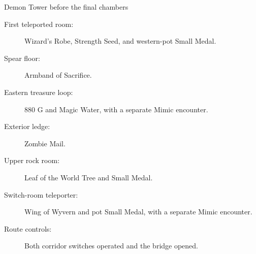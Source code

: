 \begin{routecheck}{Demon Tower before the final chambers}
\begin{description}
  \item[First teleported room:] Wizard's Robe, Strength Seed,
    and western-pot Small Medal.
  \item[Spear floor:] Armband of Sacrifice.
  \item[Eastern treasure loop:] 880 G and Magic Water, with a
    separate Mimic encounter.
  \item[Exterior ledge:] Zombie Mail.
  \item[Upper rock room:] Leaf of the World Tree and Small Medal.
  \item[Switch-room teleporter:] Wing of Wyvern and pot Small
    Medal, with a separate Mimic encounter.
  \item[Route controls:] Both corridor switches operated and
    the bridge opened.
\end{description}
\end{routecheck}

